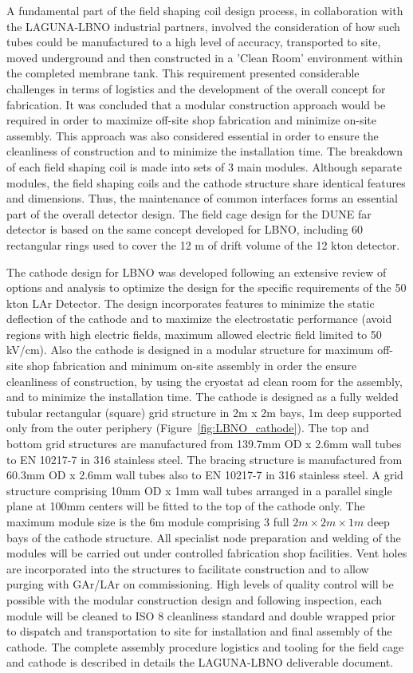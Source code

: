 A fundamental part of the field shaping coil design process, in collaboration with the LAGUNA-LBNO industrial partners, involved the consideration of how such tubes could be manufactured to a high level of accuracy, transported to site, moved underground and then constructed in a 'Clean Room' environment within the completed membrane tank.  This requirement presented considerable challenges in terms of logistics and the development of the overall concept for fabrication.  It was concluded that a modular construction approach would be required in order to maximize off-site shop fabrication and minimize on-site assembly.  This approach was also considered essential in order to ensure the cleanliness of construction and to minimize the installation time. The breakdown of each field shaping coil is made into sets of 3 main modules.  Although separate modules, the field shaping coils and the cathode structure share identical features and dimensions.  Thus, the maintenance of common interfaces forms an essential part of the overall detector design. The field cage design for the DUNE far detector is based on the same concept developed for LBNO, including 60 rectangular rings used to cover the 12 m of drift volume of the 12 kton detector.

The cathode design for LBNO was developed following an extensive review of options and analysis to optimize the design for the specific requirements of the 50 kton LAr Detector.  The design incorporates features to minimize the static deflection of the cathode and to maximize the electrostatic performance (avoid regions with high electric fields, maximum allowed electric field limited to 50 kV/cm). Also the cathode is designed in a modular structure for maximum off-site shop fabrication and minimum on-site assembly in order the ensure cleanliness of construction, by using the cryostat ad clean room for the assembly, and to minimize the installation time. The cathode is designed as a fully welded tubular rectangular (square) grid structure in 2m x 2m bays, 1m deep supported only from the outer periphery (Figure~\ref{fig:LBNO_cathode}).  The top and bottom grid structures are manufactured from 139.7mm OD x 2.6mm wall tubes to EN 10217-7 in 316 stainless steel.  The bracing structure is manufactured from 60.3mm OD x 2.6mm wall tubes also to EN 10217-7 in 316 stainless steel.  A grid structure comprising 10mm OD x 1mm wall tubes arranged in a parallel single plane at 100mm centers will be fitted to the top of the cathode only. The maximum module size is the 6m module comprising 3 full $2m \times 2m \times 1m$ deep bays of the cathode structure.  All specialist node preparation and welding of the modules will be carried out under controlled fabrication shop facilities.  Vent holes are incorporated into the structures to facilitate construction and to allow purging with GAr/LAr on commissioning. High levels of quality control will be possible with the modular construction design and following inspection, each module will be cleaned to ISO 8 cleanliness standard and double wrapped prior to dispatch and transportation to site for installation and final assembly of the cathode. The complete assembly procedure logistics and tooling for the field cage and cathode is described in details the LAGUNA-LBNO deliverable document.


